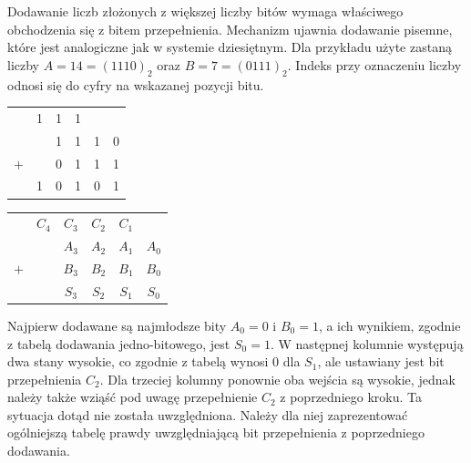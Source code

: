 \documentclass[a4paper,12pt]{article}
\begin{document}
Dodawanie liczb złożonych z większej liczby bitów wymaga właściwego obchodzenia się z bitem przepełnienia. Mechanizm ujawnia dodawanie pisemne, które jest analogiczne jak w systemie dziesiętnym. Dla przykładu użyte zastaną liczby $A = 14 = (1110)_2$ oraz $B = 7 = (0111)_2$. Indeks przy oznaczeniu liczby odnosi się do cyfry na wskazanej pozycji bitu.

\begin{table}[h!]
\centering

\begin{minipage}{5.5cm}
\centering

\begin{tabular}{  c  c  c  c  c  c  }
      & 1 & 1 & 1 &   &   \\
      &   & 1 & 1 & 1 & 0 \\
  $+$ &   & 0 & 1 & 1 & 1 \\
  \hline
      & 1 & 0 & 1 & 0 & 1 \\
\end{tabular}
\end{minipage}
\begin{minipage}{11cm}
\begin{tabular}{  c  c  c  c  c  c  }
      & $C_4$ & $C_3$ & $C_2$ & $C_1$ &       \\
      &       & $A_3$ & $A_2$ & $A_1$ & $A_0$ \\
  $+$ &       & $B_3$ & $B_2$ & $B_1$ & $B_0$ \\
  \hline
      &       & $S_3$ & $S_2$ & $S_1$ & $S_0$ \\
\end{tabular}
\end{minipage}
\end{table}

Najpierw dodawane są najmłodsze bity $A_0 = 0$ i $B_0 = 1$, a ich wynikiem, zgodnie z tabelą dodawania jedno-bitowego, jest $S_0 = 1$. W następnej kolumnie występują dwa stany wysokie, co zgodnie z tabelą wynosi $0$ dla $S_1$, ale ustawiany jest bit przepełnienia $C_2$. Dla trzeciej kolumny ponownie oba wejścia są wysokie, jednak należy także wziąść pod uwagę przepełnienie $C_2$ z poprzedniego kroku. Ta sytuacja dotąd nie została uwzględniona. Należy dla niej zaprezentować ogólniejszą tabelę prawdy uwzględniającą bit przepełnienia z poprzedniego dodawania.
\end{document}
